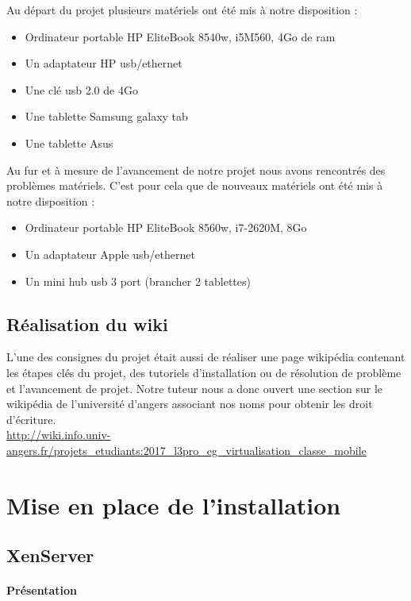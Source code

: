 \documentclass[a4paper,12pt]{article}
\begin{document}
Au départ du projet plusieurs matériels ont été mis à notre disposition :
\begin{itemize}
\item Ordinateur portable HP EliteBook 8540w, i5M560, 4Go de ram
\item Un adaptateur HP usb/ethernet
\item Une clé usb 2.0 de 4Go
\item Une tablette Samsung galaxy tab
\item Une tablette Asus\\
\end{itemize}

Au fur et à mesure de l’avancement de notre projet nous avons rencontrés des problèmes matériels. C’est pour cela que de nouveaux matériels ont été mis à notre disposition :
\begin{itemize}
\item Ordinateur portable HP EliteBook 8560w, i7-2620M, 8Go
\item Un adaptateur Apple usb/ethernet
\item Un mini hub usb 3 port (brancher 2 tablettes)
\end{itemize}

\subsection{Réalisation du wiki}

L’une des consignes du projet était aussi de réaliser une page wikipédia contenant les étapes clés du projet, des tutoriels d’installation ou de résolution de problème et l’avancement de projet.
Notre tuteur nous a donc ouvert une section sur le wikipédia de l’université d’angers associant nos noms pour obtenir les droit d’écriture.\\

\url{http://wiki.info.univ-angers.fr/projets_etudiants:2017_l3pro_eg_virtualisation_classe_mobile}


\section{Mise en place de l'installation}
\subsection{XenServer}
\paragraph{Présentation\\}
\end{document}
